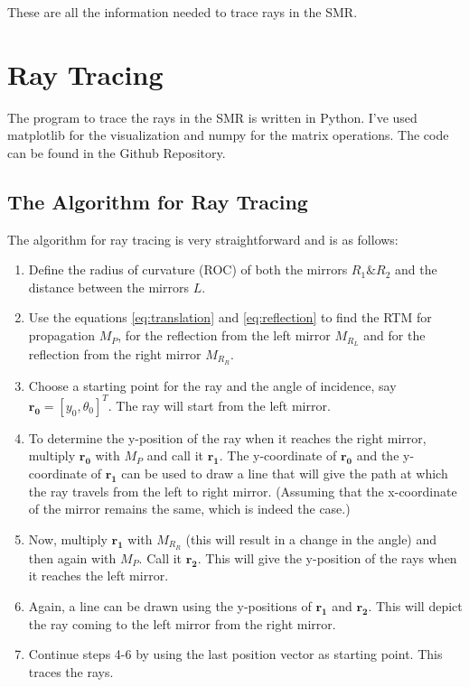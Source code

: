 \documentclass[12pt]{article}
\begin{document}
These are all the information needed to trace rays in the SMR.

\section{Ray Tracing}

The program to trace the rays in the SMR is written in Python. I've used {\color{cyan}matplotlib}\cite{matplotlib} for the visualization and {\color{cyan}numpy}\cite{numpy} for the matrix operations. The code can be found in the {\color{cyan}Github Repository}\cite{git-repo}.

\subsection{The Algorithm for Ray Tracing}
The algorithm for ray tracing is very straightforward and is as follows:
\begin{enumerate}
    \item Define the radius of curvature (ROC) of both the mirrors \(R_1 \& R_2\) and the distance between the mirrors \(L\).
    \item Use the equations \ref{eq:translation} and \ref{eq:reflection} to find the RTM for propagation \(M_P\), for the reflection from the left mirror \(M_{R_L}\) and for the reflection from the right mirror \(M_{R_R}\).
    \item Choose a starting point for the ray and the angle of incidence, say \(\mathbf{r_0} = [y_0, \theta_0]^T\). The ray will start from the left mirror.
    \item To determine the y-position of the ray when it reaches the right mirror, multiply \(\mathbf{r_0}\) with \(M_P\) and call it \(\mathbf{r_1}\). The y-coordinate of \(\mathbf{r_0}\) and the y-coordinate of \(\mathbf{r_1}\) can be used to draw a line that will give the path at which the ray travels from the left to right mirror. (Assuming that the x-coordinate of the mirror remains the same, which is indeed the case.)
    \item Now, multiply \(\mathbf{r_1}\) with \(M_{R_R}\) (this will result in a change in the angle) and then again with \(M_P\). Call it \(\mathbf{r_2}\). This will give the y-position of the rays when it reaches the left mirror.
    \item Again, a line can be drawn using the y-positions of \(\mathbf{r_1}\) and \(\mathbf{r_2}\). This will depict the ray coming to the left mirror from the right mirror.
    \item Continue steps 4-6 by using the last position vector as starting point. This traces the rays.
\end{enumerate}
\end{document}
